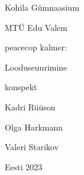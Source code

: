 \begin{titlepage}
\par{Kohila Gümnaasium}
\par{MTÜ Edu Valem}
\vspace{0.3\textheight}
\par{peacecop kalmer:}
\LARGE
\par{Looduseuurimine}
\normalsize
\par{konspekt}
\vspace{0.3\textheight}
\begin{flushright}
\par{Kadri Rüüson}
\par{Olga Harkmann}
\par{Valeri Starikov}
\end{flushright}
\vfill
Eesti
\hfill
2023
\end{titlepage}
